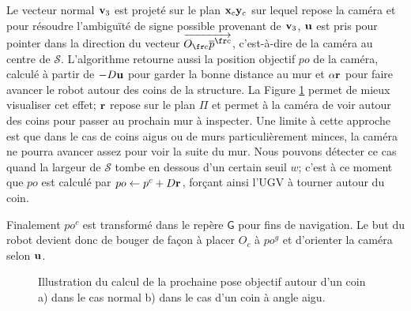 Le vecteur normal $\mathbf{v}_3$ est projeté sur le plan $\mathbf{x}_c\mathbf{y}_c$ sur lequel repose la caméra et pour résoudre l'ambiguïté de signe possible provenant de $\mathbf{v}_3$, $\mathbf{u}$ est pris pour pointer dans la direction du vecteur $\overrightarrow{O_{\fr c} \overline{p}^{\fr c}}$, c'est-à-dire de la caméra au centre de $\mathcal{S}$. L'algorithme retourne aussi la position objectif ${po}$ de la caméra, calculé à partir de $-D\mathbf{u}$ pour garder la bonne distance au mur et $\alpha \mathbf{r}$ pour faire avancer le robot autour des coins de la structure. La Figure \ref{fig:ugv_goal_determination} permet de mieux visualiser cet effet; $\mathbf{r}$ repose sur le plan $\Pi$ et permet à la caméra de voir autour des coins pour passer au prochain mur à inspecter. Une limite à cette approche est que dans le cas de coins aigus ou de murs particulièrement minces, la caméra ne pourra avancer assez pour voir la suite du mur. Nous pouvons détecter ce cas quand la largeur de $\mathcal{S}$ tombe en dessous d'un certain seuil $w$; c'est à ce moment que ${po}$ est calculé par ${po} \gets p^c + D \mathbf{r}$, forçant ainsi l'UGV à tourner autour du coin.

Finalement ${po^c}$ est transformé dans le repère $\mathsf{G}$ pour fins de navigation. Le but du robot devient donc de bouger de façon à placer $O_c$ à ${po^g}$ et d'orienter la caméra selon $\mathbf{u}$.

\begin{figure}[ht]
  \centering
  \hfil
  \caption[Illustration du calcul de la prochaine pose objectif]{
    Illustration du calcul de la prochaine pose objectif autour d'un coin a) dans le cas normal b) dans le cas d'un coin à angle aigu.
  }
  \label{fig:ugv_goal_determination}
\end{figure}

